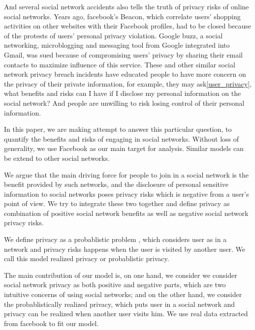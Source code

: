 \documentclass[a4paper]{article}
\begin{document}
And several social network accidents also tells the truth of privacy
risks of online social networks. Years ago, facebook's
Beacon\cite{facebook-turnoff-beacon}, which correlate users' shopping
activities on other websites with their Facebook profiles, had to be
closed because of the protests of users' personal privacy
violation. Google buzz\cite{googlebuzz}, a social networking, microblogging and
messaging tool from Google integrated into Gmail, was sued because of
compromising users' privacy by sharing their email contacts to
maximize influence of this service. These and other similar social
network privacy breach incidents have educated people to have more
concern on the privacy of their private information, for example, they
may ask\ref{user_privacy}, what benefits and risks can I have if I disclose my personal
information on the social network? And people are unwilling
to risk losing control of their personal information.

In this paper, we are making attempt to answer this particular
question, to quantify the benefits and risks of engaging in social
networks. Without loss of generality, we use Facebook as our main
target for analysis. Similar models can be extend to other social
networks. 

We argue that the main driving force for people to join in a social
network is the benefit provided by such networks, and the disclosure
of personal sensitive information to social networks poses privacy
risks which is negative from a user's point of view. We try to
integrate these two together and define privacy as combination of
positive social network benefits as well as negative social network
privacy risks. 

We define privacy as a probablistic problem , which considers user as
in a network and privacy risks happens when the user is visited by
another user. We call this model realized privacy or probablistic
privacy. 

The main contribution of our model is, on one hand, we consider we
consider social network privacy as both positive and negative parts,
which are two intuitive concerns of using social networks; and on the
other hand, we consider the probablistically realized privacy, which
puts user in a social network and privacy can be realized when another
user visits him. We use real data extracted from facebook to fit our
model. 
\end{document}
